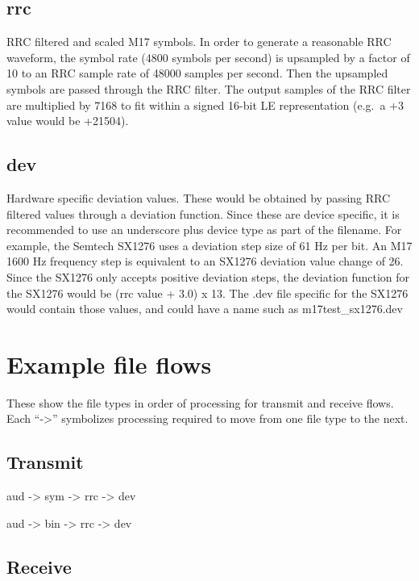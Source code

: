 \documentclass[a4paper,11pt,oneside]{book}
\begin{document}
\subsection{rrc}

RRC filtered and scaled M17 symbols. In order to generate a reasonable RRC waveform, the symbol rate (4800 symbols per second) is upsampled by a factor of 10 to an RRC sample rate of 48000 samples per second. Then the upsampled symbols are passed through the RRC filter. The output samples of the RRC filter are multiplied by 7168 to fit within a signed 16-bit LE representation (e.g.~a +3 value would be +21504).

\subsection{dev}

Hardware specific deviation values. These would be obtained by passing RRC filtered values through a deviation function. Since these are device specific, it is recommended to use an underscore plus device type as part of the filename. For example, the Semtech SX1276 uses a deviation step size of 61 Hz per bit. An M17 1600 Hz frequency step is equivalent to an SX1276 deviation value change of 26. Since the SX1276 only accepts positive deviation steps, the deviation function for the SX1276 would be (rrc value + 3.0) x 13. The .dev file specific for the SX1276 would contain those values, and could have a name such as m17test\_sx1276.dev

\section{Example file flows}

These show the file types in order of processing for transmit and receive flows. Each ``-\textgreater{}'' symbolizes processing required to move from one file type to the next.

\subsection{Transmit}

aud -\textgreater{} sym -\textgreater{} rrc -\textgreater{} dev

aud -\textgreater{} bin -\textgreater{} rrc -\textgreater{} dev

\subsection{Receive}
\end{document}

